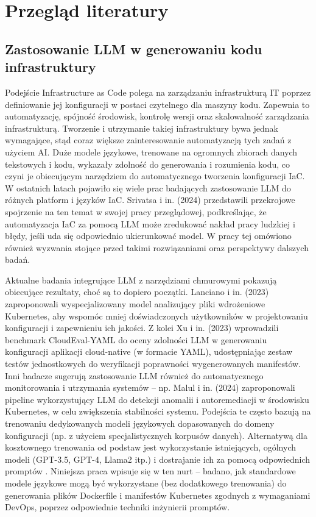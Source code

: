 \clearpage %
\section{Przegląd literatury}

\subsection{Zastosowanie LLM w generowaniu kodu infrastruktury}

Podejście Infrastructure as Code polega na zarządzaniu infrastrukturą IT poprzez definiowanie jej konfiguracji w postaci czytelnego dla maszyny kodu. Zapewnia to automatyzację, spójność środowisk, kontrolę wersji oraz skalowalność zarządzania infrastrukturą. Tworzenie i utrzymanie takiej infrastruktury bywa jednak wymagające, stąd coraz większe zainteresowanie automatyzacją tych zadań z użyciem AI. Duże modele językowe, trenowane na ogromnych zbiorach danych tekstowych i kodu, wykazały zdolność do generowania i rozumienia kodu, co czyni je obiecującym narzędziem do automatycznego tworzenia konfiguracji IaC. W ostatnich latach pojawiło się wiele prac badających zastosowanie LLM do różnych platform i języków IaC. Srivatsa i in. (2024) \cite{srivatsa_survey_2024} przedstawili przekrojowe spojrzenie na ten temat w swojej pracy przeglądowej, podkreślając, że automatyzacja IaC za pomocą LLM może zredukować nakład pracy ludzkiej i błędy, jeśli uda się odpowiednio ukierunkować model. W pracy tej omówiono również wyzwania stojące przed takimi rozwiązaniami oraz perspektywy dalszych badań.

Aktualne badania integrujące LLM z narzędziami chmurowymi pokazują obiecujące rezultaty, choć są to dopiero początki. Lanciano i in. (2023) \cite{lanciano_analyzing_2023} zaproponowali wyspecjalizowany model analizujący pliki wdrożeniowe Kubernetes, aby wspomóc mniej doświadczonych użytkowników w projektowaniu konfiguracji i zapewnieniu ich jakości. Z kolei Xu i in. (2023) \cite{ueno_migrating_2024} wprowadzili benchmark CloudEval-YAML do oceny zdolności LLM w generowaniu konfiguracji aplikacji cloud-native (w formacie YAML), udostępniając zestaw testów jednostkowych do weryfikacji poprawności wygenerowanych manifestów. Inni badacze sugerują zastosowanie LLM również do automatycznego monitorowania i utrzymania systemów – np. Malul i in. (2024) \cite{malul_genkubesec_2024} zaproponowali pipeline wykorzystujący LLM do detekcji anomalii i autoremediacji w środowisku Kubernetes, w celu zwiększenia stabilności systemu. Podejścia te często bazują na trenowaniu dedykowanych modeli językowych dopasowanych do domeny konfiguracji (np. z użyciem specjalistycznych korpusów danych). Alternatywą dla kosztownego trenowania od podstaw jest wykorzystanie istniejących, ogólnych modeli (GPT-3.5, GPT-4, Llama2 itp.) i dostrajanie \cite{liu_pre-train_2023} ich za pomocą odpowiednich promptów \cite{kratzke_dont_2024}. Niniejsza praca wpisuje się w ten nurt – badano, jak standardowe modele językowe mogą być wykorzystane (bez dodatkowego trenowania) do generowania plików Dockerfile i manifestów Kubernetes zgodnych z wymaganiami DevOps, poprzez odpowiednie techniki inżynierii promptów.

